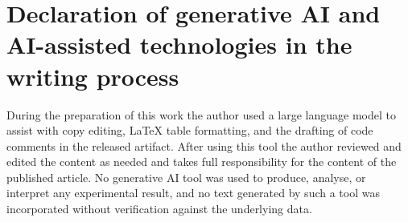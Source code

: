 \documentclass[review]{elsarticle}
\begin{document}
\section*{Declaration of generative AI and AI-assisted technologies in the writing process}
During the preparation of this work the author used a large language model to assist with copy
editing, LaTeX table formatting, and the drafting of code comments in the released artifact. After
using this tool the author reviewed and edited the content as needed and takes full responsibility
for the content of the published article. No generative AI tool was used to produce, analyse, or
interpret any experimental result, and no text generated by such a tool was incorporated without
verification against the underlying data.



\end{document}

